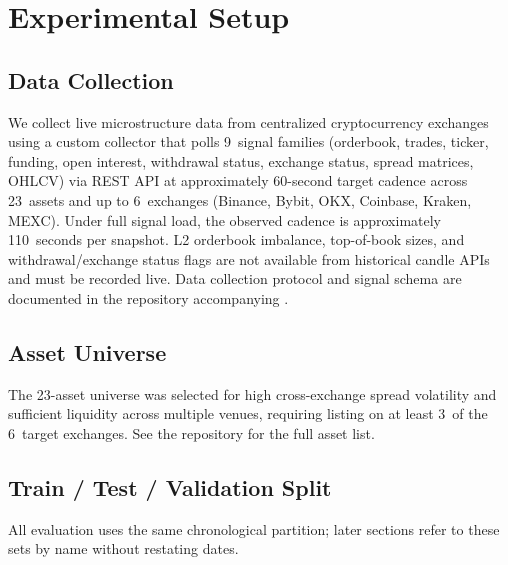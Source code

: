 \section{Experimental Setup}\label{sec:setup}

\subsection{Data Collection}

We collect live microstructure data from centralized cryptocurrency exchanges using a custom collector that polls 9~signal families (orderbook, trades, ticker, funding, open interest, withdrawal status, exchange status, spread matrices, OHLCV) via REST API at approximately 60-second target cadence across 23~assets and up to 6~exchanges (Binance, Bybit, OKX, Coinbase, Kraken, MEXC). Under full signal load, the observed cadence is approximately 110~seconds per snapshot. L2 orderbook imbalance, top-of-book sizes, and withdrawal/exchange status flags are not available from historical candle APIs and must be recorded live. Data collection protocol and signal schema are documented in the repository accompanying \datasetref.

\subsection{Asset Universe}

The 23-asset universe was selected for high cross-exchange spread volatility and sufficient liquidity across multiple venues, requiring listing on at least 3~of the 6~target exchanges. See the repository for the full asset list.

\subsection{Train / Test / Validation Split}\label{sec:splits}

All evaluation uses the same chronological partition; later sections refer to these sets by name without restating dates.

